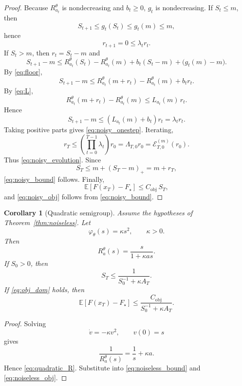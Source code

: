 \documentclass{article}
\newtheorem{corollary}[theorem]{Corollary}
\theoremstyle{definition}
\begin{document}
\begin{proof}
Because $R_{a_t}^\theta$ is nondecreasing and $b_t\ge 0$, $g_t$ is nondecreasing.
If $S_t\le m$, then
\[
S_{t+1}\le g_t(S_t)\le g_t(m)\le m,
\]
hence
\[
r_{t+1}=0\le \lambda_t r_t.
\]
If $S_t>m$, then $r_t=S_t-m$ and
\[
S_{t+1}-m
\le
R_{a_t}^\theta(S_t)-R_{a_t}^\theta(m)+b_t(S_t-m)+\bigl(g_t(m)-m\bigr).
\]
By \eqref{eq:floor},
\[
S_{t+1}-m
\le
R_{a_t}^\theta(m+r_t)-R_{a_t}^\theta(m)+b_t r_t.
\]
By \eqref{eq:L},
\[
R_{a_t}^\theta(m+r_t)-R_{a_t}^\theta(m)\le L_{a_t}(m)\,r_t.
\]
Hence
\[
S_{t+1}-m\le (L_{a_t}(m)+b_t)r_t=\lambda_t r_t.
\]
Taking positive parts gives \eqref{eq:noisy_onestep}.
Iterating,
\[
r_T\le \left(\prod_{t=0}^{T-1}\lambda_t\right)r_0=\Lambda_{T,0}r_0=\mathcal E_{T,0}^{(m)}(r_0).
\]
Thus \eqref{eq:noisy_evolution}.
Since
\[
S_T\le m+(S_T-m)_+=m+r_T,
\]
\eqref{eq:noisy_bound} follows.
Finally,
\[
\mathbb E[F(x_T)-F_\star]\le C_{\mathrm{obj}}\,S_T,
\]
and \eqref{eq:noisy_obj} follows from \eqref{eq:noisy_bound}.
\end{proof}

\begin{corollary}[Quadratic semigroup]
\label{cor:quadratic}
Assume the hypotheses of Theorem~\ref{thm:noiseless}.
Let
\[
\varphi_\theta(s)=\kappa s^2,
\qquad
\kappa>0.
\]
Then
\begin{equation}
R_a^\theta(s)=\frac{s}{1+\kappa a s}.
\label{eq:quadratic_R}
\end{equation}
If $S_0>0$, then
\begin{equation*}
S_T\le \frac{1}{S_0^{-1}+\kappa A_T}.
\end{equation*}
If \eqref{eq:obj_dom} holds, then
\begin{equation*}
\mathbb E[F(x_T)-F_\star]
\le
\frac{C_{\mathrm{obj}}}{S_0^{-1}+\kappa A_T}.
\end{equation*}
\end{corollary}

\begin{proof}
Solving
\[
\dot v=-\kappa v^2,\qquad v(0)=s
\]
gives
\[
\frac{1}{R_a^\theta(s)}=\frac{1}{s}+\kappa a.
\]
Hence \eqref{eq:quadratic_R}. Substitute into \eqref{eq:noiseless_bound} and \eqref{eq:noiseless_obj}.
\end{proof}
\end{document}
